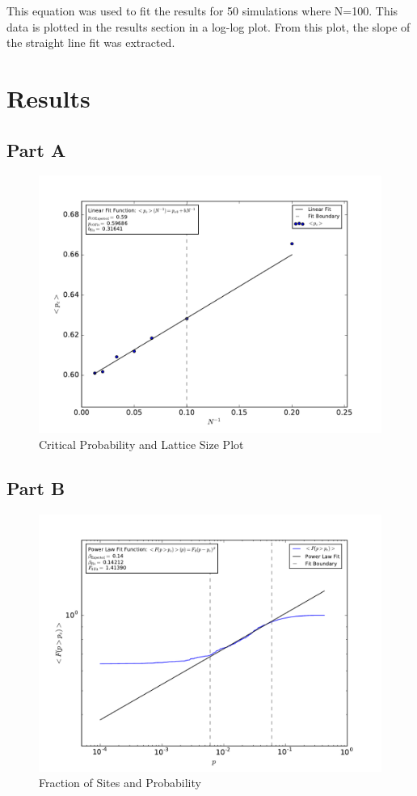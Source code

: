 \documentclass[12pt]{article}
\begin{document}
\indent This equation was used to fit the results for 50 simulations where N=100. This data is plotted in the results section in a log-log plot. From this plot, the slope of the straight line fit was extracted.

\section{Results}

\subsection{Part A}

\begin{figure}[!hbtc]
	\includegraphics[width=1\textwidth]{../output/plots_for_paper/pc_ave_vs_InverseN.pdf}
		\caption{Critical Probability and Lattice Size Plot}
		\label{fig:1}
\end{figure}

\subsection{Part B}

\begin{figure}[!hbtc]
	\includegraphics[width=1\textwidth]{../output/plots_for_paper/F_ave_vs_p.pdf}
	\caption{Fraction of Sites and Probability}
	\label{fig:2}
\end{figure}
\end{document}
